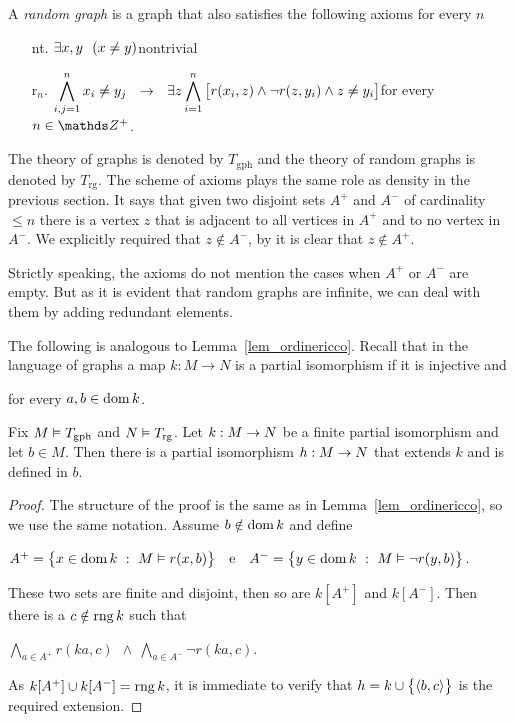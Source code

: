 A \emph{random graph\/} is a graph that also satisfies the following axioms for every $n$
\begin{itemize}
\item[nt.] $\E x,y\ \ (x\neq y)$\hfill nontrivial
\item[r$_n$.] $\displaystyle\bigwedge^n_{i,j=1} x_i\neq y_j\ \ \imp\ \ \E z \bigwedge^n_{i=1} \big[r(x_i,z) \wedge \neg r(z,y_i) \wedge z\neq y_i\big]$\hfill for every $n\in\ZZ^+$.
\end{itemize}

The theory of graphs is denoted by \emph{$T_{\textrm{gph}}$} and the theory of random graphs is denoted by \emph{$T_{\textrm{rg}}$}.
The scheme of axioms  plays the same role as density in the previous section.
It says that given two disjoint sets $A^+$ and $A^-$ of cardinality $\le n$ there is a vertex $z$ that is adjacent to all vertices in $A^+$ and to no vertex in $A^-$.
We explicitly required that $z\notin A^-$, by  it is clear that $z\notin A^+$.

Strictly speaking, the axioms  do not mention the cases when $A^+$ or $A^-$ are empty.
But as it is evident that random graphs are infinite, we can deal with them by adding redundant elements.

The following is analogous to Lemma~\ref{lem_ordinericco}.
Recall that in the language of graphs a map $k:M\to N$ is a partial isomorphism if it is injective and

\hfill for every $a,b\in\dom k$.

\begin{lemma}\label{lem_graforicco}
Fix $M\models T_{\rm gph}$ and $N\models T_{\rm rg}$.
Let $k:M\imp N$ be a finite partial isomorphism and let $b\in M$.
Then there is a partial isomorphism $h:M\imp N$ that extends $k$ and is defined in $b$.
\end{lemma}
\begin{proof} The structure of the proof is the same as in Lemma~\ref{lem_ordinericco}, so we use the same notation.
Assume $b\notin\dom k$ and define\medskip

\hfil$A^+=\big\{x\in\dom k\ :\ M\models r(x,b)\big\}\ \ \ \textrm{e}\ \ \ A^-=\big\{y\in\dom k\ :\  M\models \neg r(y,b)\big\}$.\medskip

These two sets are finite and disjoint, then so are $k[A^+]$ and $k[A^-]$.
Then there is a $c\notin\range k$ such that\medskip

\hfil$\displaystyle\bigwedge_{a\in A^+}r(ka,c)\ \ \wedge\ \bigwedge_{a\in A^-}\neg r(ka,c)$.

As $k[A^+]\cup k[A^-]=\range k$, it is immediate to verify that $h=k\cup\big\{\<b,c\>\big\}$ is the required extension.
\end{proof}

